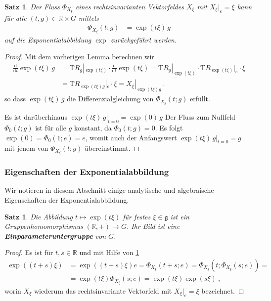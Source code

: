 \documentclass[10pt,a4paper]{article}
\theoremstyle{mytheorem}
\newtheorem{proposition}[theorem]{Satz}
\theoremstyle{mydefinition}
\newcommand{\mydef}[1]{\textbf{\textit{#1}}}
\newcommand{\dt}{\mathrm{d}}
\newcommand{\Tt}{\mathrm{T}}
\begin{document}
\begin{proposition}
\label{th:PhiFromExp}
Der Fluss $\Phi_{X_\xi}$ eines rechtsinvarianten Vektorfeldes $X_\xi$ mit $X_\xi|_e=\xi$ kann für alle $(t,g)\in\mathbb{R}\times G$ mittels
\begin{align*}
	\Phi_{X_\xi}(t;g)
	&= \exp(t\xi)\,g
\end{align*}
auf die Exponentialabbildung $\exp$ zurückgeführt werden.
\end{proposition}
\begin{proof}
Mit dem vorherigen Lemma berechnen wir
\begin{align*}
	\frac{\dt}{\dt t}\exp(t\xi)\,g
	&=
	\Tt R_g|_{\exp(t\xi)}\cdot\frac{\dt}{\dt t}\exp(t\xi)
	=
	\Tt R_g|_{\exp(t\xi)}\cdot\Tt R_{\exp(t\xi)}|_e\cdot\xi
	\nonumber\\
	&=
	\Tt R_{\exp(t\xi)g}|_e\cdot\xi = X_\xi|_{\exp(t\xi)g}
	\ .
\end{align*}
so dass $\exp(t\xi)\,g$ die Differenzialgleichung von $\Phi_{X_\xi}(t;g)$ erfüllt.

Es ist darüberhinaus $\exp(t\xi)\,g|_{t=0}=\exp(0)\,g$
Der Fluss zum Nullfeld $\Phi_0(t; g)$ ist für alle $g$ konstant, da $\dot{\Phi}_0(t; g)=0$. Es folgt $\exp(0)=\Phi_0(1; e)=e$, womit auch der Anfangswert $\exp(t\xi)\,g|_{t=0}=g$ mit jenem von $\Phi_{X_\xi}(t;g)$ übereinstimmt.
\end{proof}

\subsubsection{Eigenschaften der Exponentialabbildung}

Wir notieren in diesem Abschnitt einige analytische und algebraische Eigenschaften der Exponentialabbildung.

\begin{proposition}
Die Abbildung $t\mapsto\exp(t\xi)$ für festes $\xi\in\mathfrak{g}$ ist ein Gruppenhomomorphismus $(\mathbb{R},+)\rightarrow G$.
Ihr Bild ist eine \mydef{Einparameteruntergruppe} von $G$.
\end{proposition}
\begin{proof}
Es ist für $t,s\in\mathbb{R}$ und mit Hilfe von \ref{th:PhiFromExp}
\begin{align*}
	\exp((t+s)\xi)
	&= \exp((t+s)\xi)e
	= \Phi_{X_\xi}(t+s;e)
	= \Phi_{X_\xi}(t; \Phi_{X_\xi}(s;e))
	= 
	\nonumber\\
	&= \exp(t\xi)\Phi_{X_\xi}(s;e) = \exp(t\xi)\exp(s\xi)
	\ ,
\end{align*}
worin $X_\xi$ wiederum das rechtsinvariante Vektorfeld mit $X_\xi|_e=\xi$ bezeichnet.
\end{proof}
\end{document}
